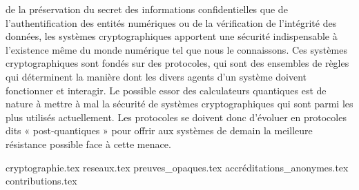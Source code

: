 
\begin{refsegment}
\label{cha:introduction}






 de la préservation du secret des informations confidentielles que de l’authentification des entités numériques ou de la vérification de l’intégrité des données, les systèmes cryptographiques apportent une sécurité indispensable à l’existence même du monde numérique tel que nous le connaissons. Ces systèmes cryptographiques sont fondés sur des protocoles, qui sont des ensembles de règles qui déterminent la manière dont les divers agents d’un système doivent fonctionner et interagir.
Le possible essor des calculateurs quantiques est de nature à mettre à mal la sécurité de systèmes cryptographiques qui sont parmi les plus utilisés actuellement. Les protocoles se doivent donc d’évoluer en protocoles dits « post-quantiques » pour offrir aux systèmes de demain la meilleure résistance possible face à cette menace.




\clearpage

{cryptographie.tex}
{reseaux.tex}
{preuves_opaques.tex}
{accréditations_anonymes.tex}
{contributions.tex}


\end{refsegment}
